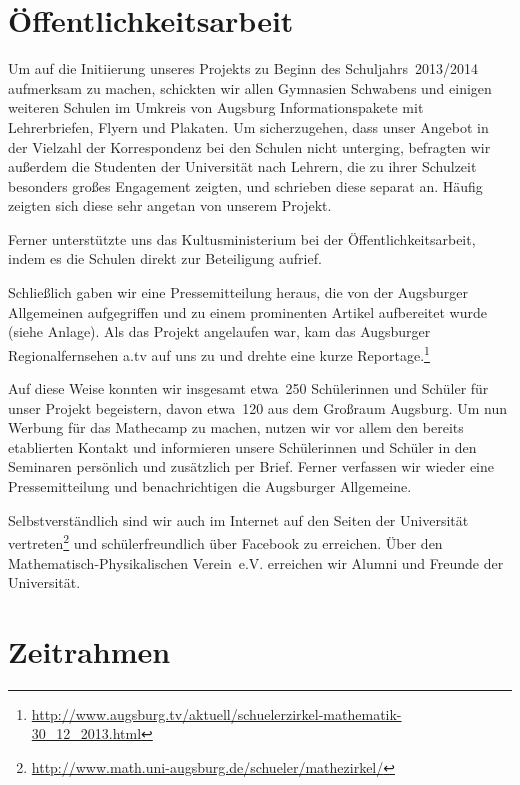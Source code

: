 \documentclass[12pt]{zettel}
\begin{document}
\section{Öffentlichkeitsarbeit}

Um auf die Initiierung unseres Projekts zu Beginn des Schuljahrs~2013/2014
aufmerksam zu machen, schickten wir allen Gymnasien Schwabens und einigen
weiteren Schulen im Umkreis von Augsburg Informationspakete mit Lehrerbriefen,
Flyern und Plakaten. Um sicherzugehen, dass unser Angebot in der
Vielzahl der Korrespondenz bei den Schulen nicht unterging, befragten wir außerdem
die Studenten der Universität nach Lehrern, die zu ihrer Schulzeit
besonders großes Engagement zeigten, und schrieben diese separat an.
Häufig zeigten sich diese sehr angetan von unserem Projekt.

Ferner unterstützte uns das Kultusministerium bei der Öffentlichkeitsarbeit, indem es die Schulen direkt zur Beteiligung aufrief.

Schließlich gaben wir eine Pressemitteilung heraus, die von der
Augsburger Allgemeinen aufgegriffen und zu einem prominenten Artikel aufbereitet
wurde (siehe Anlage). Als das Projekt angelaufen war, kam das Augsburger
Regionalfernsehen a.tv auf uns zu und drehte eine kurze Reportage.\footnote{\href{http://www.augsburg.tv/aktuell/schuelerzirkel-mathematik-30_12_2013.html}{\textsf{http:/\!/www.augsburg.tv/aktuell/schuelerzirkel-mathematik-30\_{}12\_{}2013.html}}}

Auf diese Weise konnten wir insgesamt etwa~250 Schülerinnen und Schüler für
unser Projekt begeistern, davon etwa~120 aus dem Großraum Augsburg. Um nun Werbung für
das Mathecamp zu machen, nutzen wir vor allem den bereits etablierten Kontakt
und informieren unsere Schülerinnen und Schüler in den Seminaren persönlich und
zusätzlich per Brief. Ferner verfassen wir wieder eine Pressemitteilung und
benachrichtigen die Augsburger Allgemeine.

Selbstverständlich sind wir auch im Internet auf den Seiten der Universität
vertreten\footnote{\href{http://www.math.uni-augsburg.de/schueler/mathezirkel/}{\textsf{http:/\!/www.math.uni-augsburg.de/schueler/mathezirkel/}}} und schülerfreundlich über Facebook zu erreichen. Über den
Mathematisch-Physikalischen Verein~e.V. erreichen wir Alumni und Freunde der
Universität.


\section{Zeitrahmen}
\end{document}

